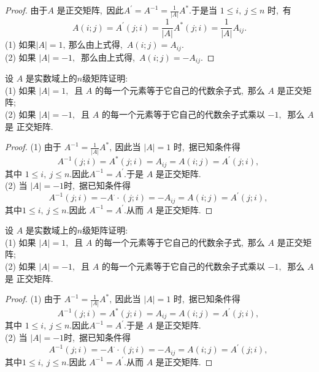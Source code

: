 \begin{proof}
	由于$  A $ 是正交矩阵,\  因此$  A^{\prime}=A^{-1}=\frac{1}{|A|} A^{*} .$于是当 $ 1 \leqslant i,\  j \leqslant n $ 时,\  有
	$$A(i ; j)=A^{\prime}(j ; i)=\frac{1}{|A|} A^{*}(j ; i)=\frac{1}{|A|} A_{i j} .$$
	(1) 如果$  |A|=1 ,\  $那么由上式得,\  $ A(i ; j)=A_{i j} .$\\
	(2) 如果 $ |A|=-1 ,\ $ 那么由上式得,\  $ A(i ; j)=-A_{i j} .$
\end{proof}
\begin{problem}
	设 $ A $ 是实数域上的$  n  $级矩阵证明:\\
	(1) 如果 $ |A|=1 ,\ $ 且  $A $ 的每一个元素等于它自己的代数余子式,\  那么 $ A $ 是正交矩阵;\\
	(2) 如果 $ |A|=-1 ,\ $ 且  $A $ 的每一个元素等于它自己的代数余子式乘以 $ -1 ,\ $ 那么  $A  $是 正交矩阵.
\end{problem}
\begin{proof}
	(1) 由于 $ A^{-1}=\frac{1}{|A|} A^{*} ,\  $因此当 $ |A|=1 $ 时,\  据已知条件得
	$$A^{-1}(j ; i)=A^{*}(j ; i)=A_{i j}=A(i ; j)=A^{\prime}(j ; i),\ $$
	其中 $ 1 \leqslant i,\  j \leqslant n .$因此$  A^{-1}=A^{\prime} .$于是  $A $ 是正交矩阵.\\
	(2) 当 $ |A|=-1  $时,\  据已知条件得
	$$A^{-1}(j ; i)=-A^{\cdot} \cdot(j ; i)=-A_{i j}=A(i ; j)=A^{\prime}(j ; i),\ $$
	其中$  1 \leqslant i,\  j \leqslant n .$因此 $ A^{-1}=A^{\prime} .$从而 $ A $ 是正交矩阵.
\end{proof}
\begin{problem}
	设 $ A $ 是实数域上的$  n  $级矩阵证明:\\
	(1) 如果 $ |A|=1 ,\ $ 且  $A $ 的每一个元素等于它自己的代数余子式,\  那么 $ A $ 是正交矩阵;\\
	(2) 如果 $ |A|=-1 ,\ $ 且  $A $ 的每一个元素等于它自己的代数余子式乘以 $ -1 ,\ $ 那么  $A  $是 正交矩阵.
\end{problem}
\begin{proof}
	(1) 由于 $ A^{-1}=\frac{1}{|A|} A^{*} ,\  $因此当 $ |A|=1 $ 时,\  据已知条件得
	$$A^{-1}(j ; i)=A^{*}(j ; i)=A_{i j}=A(i ; j)=A^{\prime}(j ; i),\ $$
	其中 $ 1 \leqslant i,\  j \leqslant n .$因此$  A^{-1}=A^{\prime} .$于是  $A $ 是正交矩阵.\\
	(2) 当 $ |A|=-1  $时,\  据已知条件得
	$$A^{-1}(j ; i)=-A^{\cdot} \cdot(j ; i)=-A_{i j}=A(i ; j)=A^{\prime}(j ; i),\ $$
	其中$  1 \leqslant i,\  j \leqslant n .$因此 $ A^{-1}=A^{\prime} .$从而 $ A $ 是正交矩阵.
\end{proof}
\newpage

